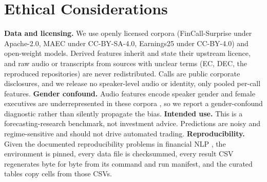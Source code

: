 \section*{Ethical Considerations}

\textbf{Data and licensing.} We use openly licensed corpora (FinCall-Surprise
under Apache-2.0, MAEC under CC-BY-SA-4.0, Earnings25 under CC-BY-4.0) and
open-weight models. Derived features inherit and state their upstream licence, and
raw audio or transcripts from sources with unclear terms (EC, DEC, the reproduced
repositories) are never redistributed. Calls are public corporate disclosures, and
we release no speaker-level audio or identity, only pooled per-call features.
\textbf{Gender confound.} Audio features encode speaker gender and female
executives are underrepresented in these corpora
\citep{ama2024,emobias2024,docfin2022}, so we report a gender-confound diagnostic
rather than silently propagate the bias. \textbf{Intended use.} This is a
forecasting-research benchmark, not investment advice. Predictions are noisy and
regime-sensitive and should not drive automated trading.
\textbf{Reproducibility.} Given the documented reproducibility problems in
financial NLP \citep{finnlp2025survey}, the environment is pinned, every data file is
checksummed, every result CSV regenerates byte for byte from its command and run
manifest, and the curated tables copy cells from those CSVs.
